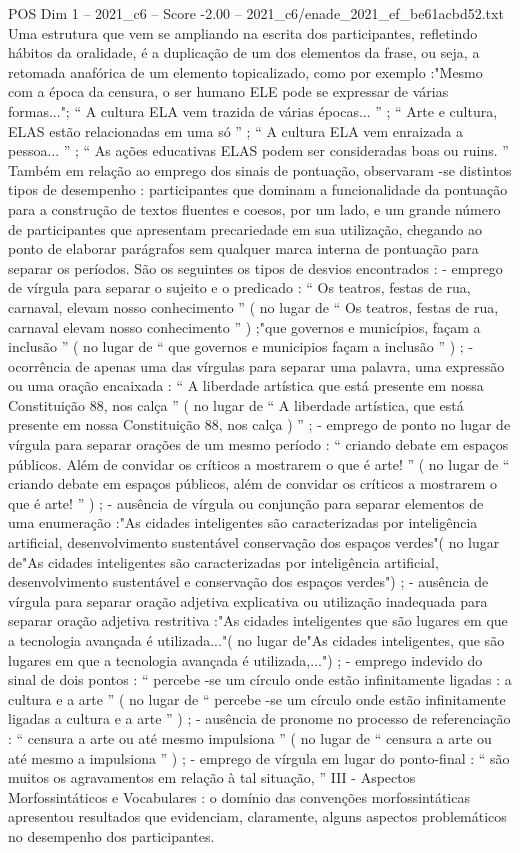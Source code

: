 \begin{textsample}{POS Dim 1 – 2021\_c6 – Score -2.00 – 2021\_c6/enade\_2021\_ef\_be61acbd52.txt}
Uma estrutura que vem se ampliando na escrita dos participantes, refletindo hábitos da oralidade, é a duplicação de um dos elementos da frase, ou seja, a retomada anafórica de um elemento topicalizado, como por exemplo :"Mesmo com a época da censura, o ser humano ELE pode se expressar de várias formas..."; “ A cultura ELA vem trazida de várias épocas... ” ; “ Arte e cultura, ELAS estão relacionadas em uma só ” ; “ A cultura ELA vem enraizada a pessoa... ” ; “ As ações educativas ELAS podem ser consideradas boas ou ruins. ” Também em relação ao emprego dos sinais de pontuação, observaram -se distintos tipos de desempenho : participantes que dominam a funcionalidade da pontuação para a construção de textos fluentes e coesos, por um lado, e um grande número de participantes que apresentam precariedade em sua utilização, chegando ao ponto de elaborar parágrafos sem qualquer marca interna de pontuação para separar os períodos.
São os seguintes os tipos de desvios encontrados : - emprego de vírgula para separar o sujeito e o predicado : “ Os teatros, festas de rua, carnaval, elevam nosso conhecimento ” ( no lugar de “ Os teatros, festas de rua, carnaval elevam nosso conhecimento ” ) ;"que governos e municípios, façam a inclusão ” ( no lugar de “ que governos e municipios façam a inclusão ” ) ; - ocorrência de apenas uma das vírgulas para separar uma palavra, uma expressão ou uma oração encaixada : “ A liberdade artística que está presente em nossa Constituição 88, nos calça ” ( no lugar de “ A liberdade artística, que está presente em nossa Constituição 88, nos calça ) ” ; - emprego de ponto no lugar de vírgula para separar orações de um mesmo período : “ criando debate em espaços públicos.
Além de convidar os críticos a mostrarem o que é arte! ” ( no lugar de “ criando debate em espaços públicos, além de convidar os críticos a mostrarem o que é arte! ” ) ; - ausência de vírgula ou conjunção para separar elementos de uma enumeração :"As cidades inteligentes são caracterizadas por inteligência artificial, desenvolvimento sustentável conservação dos espaços verdes"( no lugar de"As cidades inteligentes são caracterizadas por inteligência artificial, desenvolvimento sustentável e conservação dos espaços verdes") ; - ausência de vírgula para separar oração adjetiva explicativa ou utilização inadequada para separar oração adjetiva restritiva :"As cidades inteligentes que são lugares em que a tecnologia avançada é utilizada..."( no lugar de"As cidades inteligentes, que são lugares em que a tecnologia avançada é utilizada,...") ; - emprego indevido do sinal de dois pontos : “ percebe -se um círculo onde estão infinitamente ligadas : a cultura e a arte ” ( no lugar de “ percebe -se um círculo onde estão infinitamente ligadas a cultura e a arte ” ) ; - ausência de pronome no processo de referenciação : “ censura a arte ou até mesmo impulsiona ” ( no lugar de “ censura a arte ou até mesmo a impulsiona ” ) ; - emprego de vírgula em lugar do ponto-final : “ são muitos os agravamentos em relação à tal situação, ” III - Aspectos Morfossintáticos e Vocabulares : o domínio das convenções morfossintáticas apresentou resultados que evidenciam, claramente, alguns aspectos problemáticos no desempenho dos participantes.

\end{textsample}
